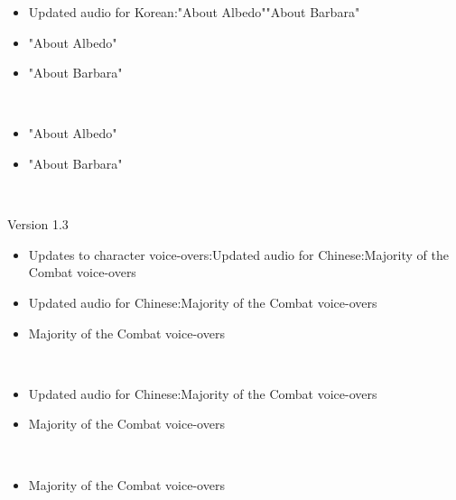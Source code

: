 \documentclass[a4paper,12pt]{article}
\begin{document}
\begin{itemize}
\item Updated audio for Korean:"About Albedo""About Barbara"
\item "About Albedo"
\item "About Barbara"
\end{itemize}\\ \par \vspace{0.5cm}

\begin{itemize}
\item "About Albedo"
\item "About Barbara"
\end{itemize}\\ \par \vspace{0.5cm}

Version 1.3\\ \par \vspace{0.5cm}

\begin{itemize}
\item Updates to character voice-overs:Updated audio for Chinese:Majority of the Combat voice-overs
\item Updated audio for Chinese:Majority of the Combat voice-overs
\item Majority of the Combat voice-overs
\end{itemize}\\ \par \vspace{0.5cm}

\begin{itemize}
\item Updated audio for Chinese:Majority of the Combat voice-overs
\item Majority of the Combat voice-overs
\end{itemize}\\ \par \vspace{0.5cm}

\begin{itemize}
\item Majority of the Combat voice-overs
\end{itemize}\\ \par \vspace{0.5cm}
\end{document}
